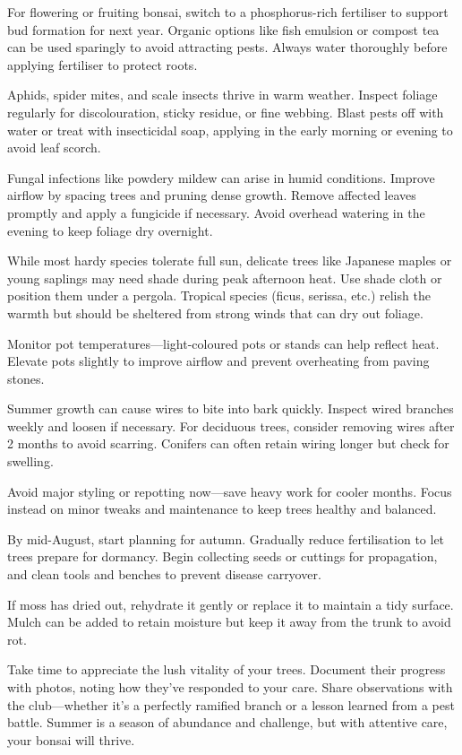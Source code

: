 For flowering or fruiting bonsai, switch to a phosphorus\--rich fertiliser to support bud formation for next year.
Organic options like fish emulsion or compost tea can be used sparingly to avoid attracting pests.
Always water thoroughly before applying fertiliser to protect roots.

\columnbreak

\medskip
{}
\noindent
Aphids, spider mites, and scale insects thrive in warm weather.
Inspect foliage regularly for discolouration, sticky residue, or fine webbing.
Blast pests off with water or treat with insecticidal soap, applying in the early morning or evening to avoid leaf scorch.

Fungal infections like powdery mildew can arise in humid conditions.
Improve airflow by spacing trees and pruning dense growth.
Remove affected leaves promptly and apply a fungicide if necessary.
Avoid overhead watering in the evening to keep foliage dry overnight.

\medskip
{}
\noindent
While most hardy species tolerate full sun, delicate trees like Japanese maples or young saplings may need shade during peak afternoon heat.
Use shade cloth or position them under a pergola.
Tropical species (ficus, serissa, etc.) relish the warmth but should be sheltered from strong winds that can dry out foliage.

Monitor pot temperatures---light\--coloured pots or stands can help reflect heat.
Elevate pots slightly to improve airflow and prevent overheating from paving stones.

\medskip
{}
\noindent
Summer growth can cause wires to bite into bark quickly.
Inspect wired branches weekly and loosen if necessary.
For deciduous trees, consider removing wires after 2 months to avoid scarring.
Conifers can often retain wiring longer but check for swelling.

Avoid major styling or repotting now---save heavy work for cooler months.
Focus instead on minor tweaks and maintenance to keep trees healthy and balanced.

\medskip
{}
\noindent
By mid\--August, start planning for autumn.
Gradually reduce fertilisation to let trees prepare for dormancy.
Begin collecting seeds or cuttings for propagation, and clean tools and benches to prevent disease carryover.

If moss has dried out, rehydrate it gently or replace it to maintain a tidy surface.
Mulch can be added to retain moisture but keep it away from the trunk to avoid rot.

\medskip
{}
\noindent
Take time to appreciate the lush vitality of your trees.
Document their progress with photos, noting how they've responded to your care.
Share observations with the club---whether it's a perfectly ramified branch or a lesson learned from a pest battle.
Summer is a season of abundance and challenge, but with attentive care, your bonsai will thrive.
\closearticle
\pagebreak
